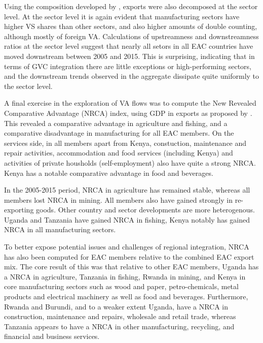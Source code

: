 \documentclass[a4paper]{article}
\begin{document}
 Using the composition developed by \citet{wang2013quantifying}, exports were also decomposed at the sector level. At the sector level it is again evident that manufacturing sectors have higher VS shares than other sectors, and also higher amounts of double counting, although mostly of foreign VA. Calculations of upstreamness and downstreamness ratios at the sector level suggest that nearly all setors in all EAC countries have moved downstream between 2005 and 2015. This is surprising, indicating that in terms of GVC integration there are little exceptions or high-performing sectors, and the downstream trends observed in the aggregate dissipate quite uniformly to the sector level. \newline 

A final exercise in the exploration of VA flows was to compute the New Revealed Comparative Advantage (NRCA) index,  using GDP in exports as proposed by \citet{koopman2014tracing}. This revealed a comparative advantage in agriculture and fishing, and a comparative disadvantage in manufacturing for all EAC members. On the services side, in all members apart from Kenya, constuction, maintenance and repair activities, accommodation and food services (including Kenya) and activities of private housholds (self-employment) also have quite a strong NRCA. Kenya has a notable comparative advantage in food and beverages. \newline

In the 2005-2015 period, NRCA in agriculture has remained stable, whereas all members lost NRCA in mining. All members also have gained strongly in re-exporting goods.  Other country and sector developments are more heterogenous. Uganda and Tanzania have gained NRCA in fishing, Kenya notably has gained NRCA in all manufacturing sectors. \newline

To better expose potential issues and challenges of regional integration, NRCA has also been computed for EAC members relative to the combined EAC export mix. The core result of this was that relative to other EAC members, Uganda has a NRCA in agriculture, Tanzania in fishing, Rwanda in mining, and Kenya in core manufacturing sectors such as wood and paper, petro-chemicals, metal products and electrical machinery as well as food and beverages. Furthermore, Rwanda and Burundi, and to a weaker extent Uganda, have a NRCA in construction, maintenance and repairs, wholesale and retail trade, whereas Tanzania appears to have a NRCA in other manufacturing, recycling, and financial and business services.
\end{document}
